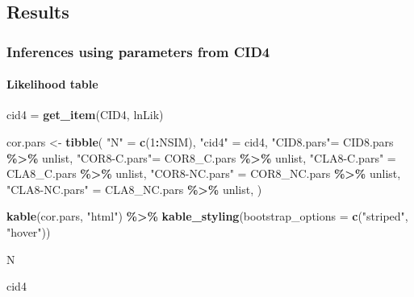 \documentclass[
]{article}
\newenvironment{Shaded}{\begin{snugshade}}{\end{snugshade}}
\newcommand{\AttributeTok}[1]{\textcolor[rgb]{0.13,0.29,0.53}{#1}}
\newcommand{\DecValTok}[1]{\textcolor[rgb]{0.00,0.00,0.81}{#1}}
\newcommand{\FunctionTok}[1]{\textcolor[rgb]{0.13,0.29,0.53}{\textbf{#1}}}
\newcommand{\NormalTok}[1]{#1}
\newcommand{\OtherTok}[1]{\textcolor[rgb]{0.56,0.35,0.01}{#1}}
\newcommand{\SpecialCharTok}[1]{\textcolor[rgb]{0.81,0.36,0.00}{\textbf{#1}}}
\newcommand{\StringTok}[1]{\textcolor[rgb]{0.31,0.60,0.02}{#1}}
\begin{document}
\hypertarget{results}{%
\subsection{Results}\label{results}}

\hypertarget{inferences-using-parameters-from-cid4-1}{%
\subsubsection{Inferences using parameters from CID4}\label{inferences-using-parameters-from-cid4-1}}

\hypertarget{likelihood-table}{%
\paragraph{Likelihood table}\label{likelihood-table}}

\begin{Shaded}
\begin{Highlighting}[]
\NormalTok{cid4 }\OtherTok{=} \FunctionTok{get\_item}\NormalTok{(CID4, }\StringTok{\textquotesingle{}lnLik\textquotesingle{}}\NormalTok{)}

\NormalTok{cor.pars }\OtherTok{\textless{}{-}} \FunctionTok{tibble}\NormalTok{(}
\StringTok{"N"} \OtherTok{=} \FunctionTok{c}\NormalTok{(}\DecValTok{1}\SpecialCharTok{:}\NormalTok{NSIM),}
\StringTok{"cid4"} \OtherTok{=}\NormalTok{ cid4,}
\StringTok{"CID8.pars"}\OtherTok{=}\NormalTok{ CID8.pars }\SpecialCharTok{\%\textgreater{}\%}\NormalTok{ unlist,}
\StringTok{"COR8{-}C.pars"}\OtherTok{=}\NormalTok{ COR8\_C.pars }\SpecialCharTok{\%\textgreater{}\%}\NormalTok{ unlist,}
\StringTok{"CLA8{-}C.pars"} \OtherTok{=}\NormalTok{ CLA8\_C.pars }\SpecialCharTok{\%\textgreater{}\%}\NormalTok{ unlist,}
\StringTok{"COR8{-}NC.pars"} \OtherTok{=}\NormalTok{ COR8\_NC.pars }\SpecialCharTok{\%\textgreater{}\%}\NormalTok{ unlist,}
\StringTok{"CLA8{-}NC.pars"} \OtherTok{=}\NormalTok{ CLA8\_NC.pars }\SpecialCharTok{\%\textgreater{}\%}\NormalTok{ unlist,}
\NormalTok{)}

\FunctionTok{kable}\NormalTok{(cor.pars, }\StringTok{"html"}\NormalTok{) }\SpecialCharTok{\%\textgreater{}\%}
  \FunctionTok{kable\_styling}\NormalTok{(}\AttributeTok{bootstrap\_options =} \FunctionTok{c}\NormalTok{(}\StringTok{"striped"}\NormalTok{, }\StringTok{"hover"}\NormalTok{))}
\end{Highlighting}
\end{Shaded}

N

cid4
\end{document}
